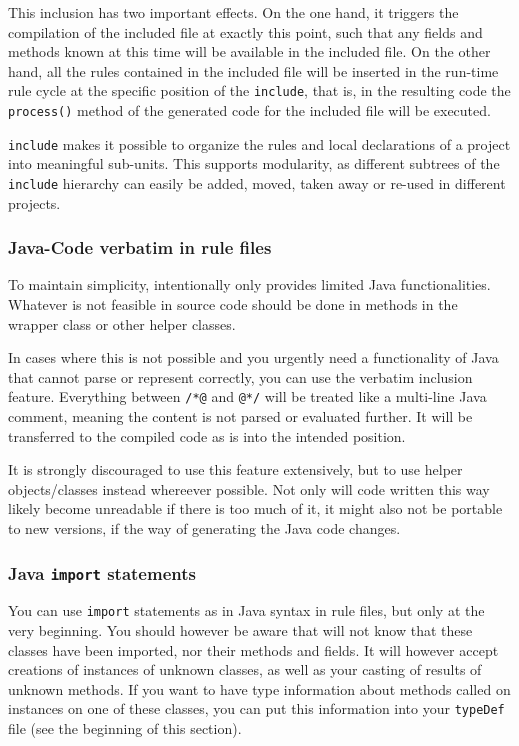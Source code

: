 This inclusion has two important effects. On the one hand, it triggers
the compilation of the included file at exactly this point, such that
any fields and methods known at this time will be available in the
included file. On the other hand, all the rules contained in the
included file will be inserted in the run-time rule cycle at the
specific position of the \texttt{include}, that is, in the resulting
code the \texttt{process()} method of the generated code for the
included file will be executed.

\texttt{include} makes it possible to organize the rules and local
declarations of a project into meaningful sub-units. This supports
modularity, as different subtrees of the \texttt{include} hierarchy can
easily be added, moved, taken away or re-used in different projects.

\subsubsection{Java-Code verbatim in rule files} \label{sec:rudi-verbatim}

To maintain simplicity, \vonda intentionally only provides limited Java
functionalities. Whatever is not feasible in \vonda source code should be done
in methods in the wrapper class or other helper classes.

In cases where this is not possible and you urgently need a
functionality of Java that \vonda cannot parse or represent correctly,
you can use the verbatim inclusion feature. Everything between
\verb|/*@| and \verb|@*/| will be treated like a multi-line Java
comment, meaning the content is not parsed or evaluated further. It
will be transferred to the compiled code as is into the intended
position.

It is strongly discouraged to use this feature extensively, but to use
helper objects/classes instead whereever possible. Not only will code
written this way likely become unreadable if there is too much of it,
it might also not be portable to new \vonda versions, if the way of
generating the Java code changes.

\subsubsection{Java \texttt{import}
  statements} \label{sec:java-import}

You can use \texttt{import} statements as in Java syntax in rule
files, but only at the very beginning. You should however be aware
that \vonda will not know that these classes have been imported, nor
their methods and fields. It will however accept creations of
instances of unknown classes, as well as your casting of results of
unknown methods. If you want \vonda to have type information about
methods called on instances on one of these classes, you can put this
information into your \texttt{typeDef} file (see the beginning of this
section).

